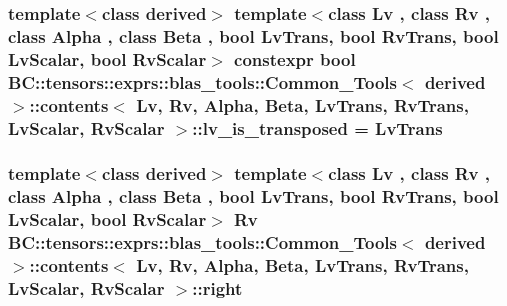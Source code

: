 \subsubsection[{\texorpdfstring{lv\+\_\+is\+\_\+transposed}{lv_is_transposed}}]{\setlength{\rightskip}{0pt plus 5cm}template$<$class derived$>$ template$<$class Lv , class Rv , class Alpha , class Beta , bool Lv\+Trans, bool Rv\+Trans, bool Lv\+Scalar, bool Rv\+Scalar$>$ constexpr bool {\bf B\+C\+::tensors\+::exprs\+::blas\+\_\+tools\+::\+Common\+\_\+\+Tools}$<$ derived $>$\+::{\bf contents}$<$ Lv, Rv, Alpha, Beta, Lv\+Trans, Rv\+Trans, Lv\+Scalar, Rv\+Scalar $>$\+::lv\+\_\+is\+\_\+transposed = Lv\+Trans\hspace{0.3cm}{\ttfamily [static]}}\hypertarget{structBC_1_1tensors_1_1exprs_1_1blas__tools_1_1Common__Tools_1_1contents_a2ba758f02151cede45aba8f58dc48e74}{}\label{structBC_1_1tensors_1_1exprs_1_1blas__tools_1_1Common__Tools_1_1contents_a2ba758f02151cede45aba8f58dc48e74}
\subsubsection[{\texorpdfstring{right}{right}}]{\setlength{\rightskip}{0pt plus 5cm}template$<$class derived$>$ template$<$class Lv , class Rv , class Alpha , class Beta , bool Lv\+Trans, bool Rv\+Trans, bool Lv\+Scalar, bool Rv\+Scalar$>$ Rv {\bf B\+C\+::tensors\+::exprs\+::blas\+\_\+tools\+::\+Common\+\_\+\+Tools}$<$ derived $>$\+::{\bf contents}$<$ Lv, Rv, Alpha, Beta, Lv\+Trans, Rv\+Trans, Lv\+Scalar, Rv\+Scalar $>$\+::right}\hypertarget{structBC_1_1tensors_1_1exprs_1_1blas__tools_1_1Common__Tools_1_1contents_a3515e38305bda743b1b008bf3bbca51a}{}\label{structBC_1_1tensors_1_1exprs_1_1blas__tools_1_1Common__Tools_1_1contents_a3515e38305bda743b1b008bf3bbca51a}
